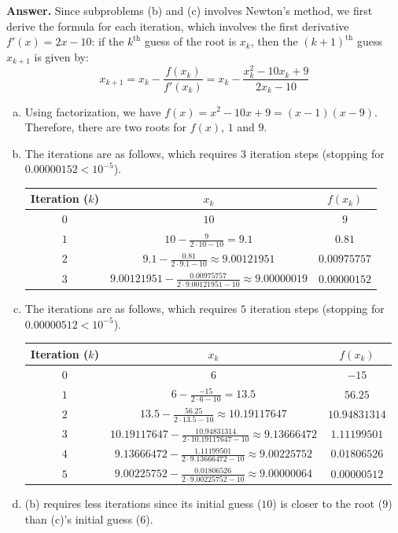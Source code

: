 \documentclass[11pt,letterpaper]{article}
\newcounter{problem}
\newcommand{\answer}{\noindent \textbf{Answer. }}
\begin{document}
\answer Since subproblems (b) and (c) involves Newton's method, we first derive the formula for each iteration, which involves the first derivative $f'(x) = 2x-10$: if the $k^{\text{th}}$ guess of the root is $x_k$, then the $(k+1)^{\text{th}}$ guess $x_{k+1}$ is given by:
\[x_{k+1} = x_k - \frac{f(x_k)}{f'(x_k)} = x_k - \frac{x_k^2-10x_k+9}{2x_k-10}\]
\begin{enumerate}[(a)]
    \item Using factorization, we have $f(x) = x^2 - 10x + 9 = (x-1)(x-9)$.  Therefore, there are two roots for $f(x)$, $1$ and $9$.
    \item The iterations are as follows, which requires $3$ iteration steps (stopping for $0.00000152 < 10^{-5}$).
    \begin{center}
        \begin{tabular}{ccc}
            Iteration ($k$) & $x_k$ & $f(x_k)$ \\
            \hline
            $0$ & $10$ & $9$\\
            $1$ & $10-\frac{9}{2 \cdot 10 - 10} = 9.1$ & $0.81$\\
            $2$ & $9.1 - \frac{0.81}{2 \cdot 9.1 - 10} \approx 9.00121951$ & $0.00975757$\\
            $3$ & $9.00121951 - \frac{0.00975757}{2 \cdot 9.00121951 - 10} \approx 9.00000019$ & $0.00000152$
        \end{tabular}    
    \end{center}
    \item The iterations are as follows, which requires $5$ iteration steps (stopping for $0.00000512 < 10^{-5}$).
    \begin{center}
        \begin{tabular}{ccc}
            Iteration ($k$) & $x_k$ & $f(x_k)$ \\
            \hline
            $0$ & $6$ & $-15$\\
            $1$ & $6-\frac{-15}{2 \cdot 6 - 10} = 13.5$ & $56.25$\\
            $2$ & $13.5 - \frac{56.25}{2 \cdot 13.5 - 10} \approx 10.19117647$ & $10.94831314$\\
            $3$ & $10.19117647 - \frac{10.94831314}{2 \cdot 10.19117647 - 10} \approx 9.13666472$ & $1.11199501$\\
            $4$ & $9.13666472 - \frac{1.11199501}{2 \cdot 9.13666472 - 10} \approx 9.00225752$ & $0.01806526$\\
            $5$ & $9.00225752 - \frac{0.01806526}{2 \cdot 9.00225752 - 10} \approx 9.00000064$ & $0.00000512$
        \end{tabular}    
    \end{center}
    \item (b) requires less iterations since its initial guess ($10$) is closer to the root ($9$) than (c)'s initial guess ($6$).
\end{enumerate}\vspace{6mm}
\end{document}
